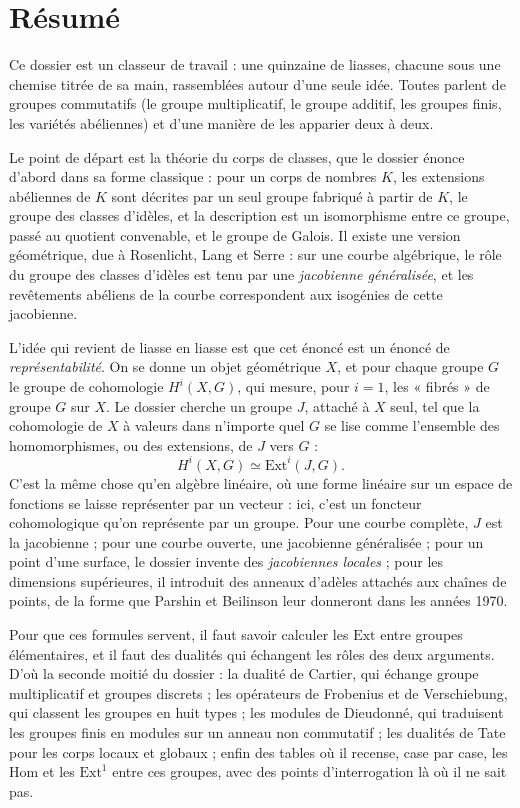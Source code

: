 \documentclass[11pt,a4paper]{article}
\begin{document}
\section*{Résumé}

\begin{resume}
Ce dossier est un classeur de travail : une quinzaine de liasses, chacune sous
une chemise titrée de sa main, rassemblées autour d'une seule idée. Toutes
parlent de groupes commutatifs (le groupe multiplicatif, le groupe additif,
les groupes finis, les variétés abéliennes) et d'une manière de les apparier
deux à deux.

Le point de départ est la théorie du corps de classes, que le dossier énonce
d'abord dans sa forme classique : pour un corps de nombres $K$, les extensions
abéliennes de $K$ sont décrites par un seul groupe fabriqué à partir de $K$, le
groupe des classes d'idèles, et la description est un isomorphisme entre ce
groupe, passé au quotient convenable, et le groupe de Galois. Il existe une version
géométrique, due à Rosenlicht, Lang et Serre : sur une courbe algébrique, le
rôle du groupe des classes d'idèles est tenu par une \emph{jacobienne
généralisée}, et les revêtements abéliens de la courbe correspondent aux
isogénies de cette jacobienne.

L'idée qui revient de liasse en liasse est que cet énoncé est un
énoncé de \emph{représentabilité}. On se donne un objet géométrique $X$, et
pour chaque groupe $G$ le groupe de cohomologie $H^i(X,G)$, qui mesure, pour
$i = 1$, les « fibrés » de groupe $G$ sur $X$. Le dossier cherche un groupe
$J$, attaché à $X$ seul, tel que la cohomologie de $X$ à valeurs dans
n'importe quel $G$ se lise comme l'ensemble des homomorphismes, ou des
extensions, de $J$ vers $G$ :
\[
H^i(X, G) \simeq \mathrm{Ext}^i(J, G).
\]
C'est la même chose qu'en algèbre linéaire, où une forme linéaire sur un espace
de fonctions se laisse représenter par un vecteur : ici, c'est un foncteur
cohomologique qu'on représente par un groupe. Pour une courbe complète, $J$ est
la jacobienne ; pour une courbe ouverte, une jacobienne généralisée ; pour un
point d'une surface, le dossier invente des \emph{jacobiennes locales} ; pour
les dimensions supérieures, il introduit des anneaux d'adèles attachés aux
chaînes de points, de la forme que Parshin et Beilinson leur donneront dans les
années 1970.

Pour que ces formules servent, il faut savoir calculer les $\mathrm{Ext}$ entre
groupes élémentaires, et il faut des dualités qui échangent les rôles des deux
arguments. D'où la seconde moitié du dossier : la dualité de Cartier, qui
échange groupe multiplicatif et groupes discrets ; les opérateurs de Frobenius
et de Verschiebung, qui classent les groupes en huit types ; les modules de
Dieudonné, qui traduisent les groupes finis en modules sur un anneau
non commutatif ; les dualités de Tate pour les corps locaux et globaux ; enfin
des tables où il recense, case par case, les $\mathrm{Hom}$ et les
$\mathrm{Ext}^1$ entre ces groupes, avec des points d'interrogation là où il ne
sait pas.


\end{resume}
\end{document}
